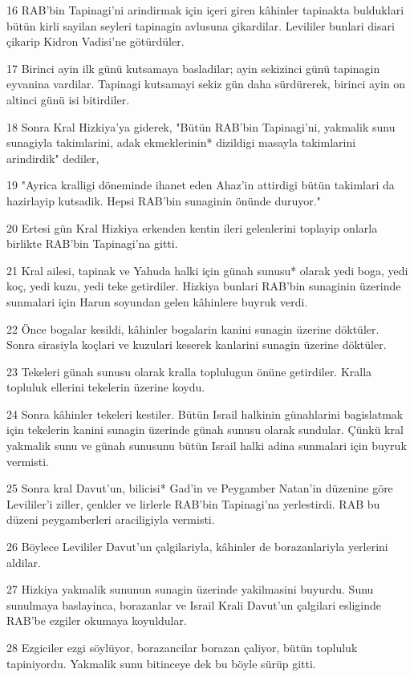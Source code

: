 \par 16 RAB'bin Tapinagi'ni arindirmak için içeri giren kâhinler tapinakta bulduklari bütün kirli sayilan seyleri tapinagin avlusuna çikardilar. Levililer bunlari disari çikarip Kidron Vadisi'ne götürdüler.
\par 17 Birinci ayin ilk günü kutsamaya basladilar; ayin sekizinci günü tapinagin eyvanina vardilar. Tapinagi kutsamayi sekiz gün daha sürdürerek, birinci ayin on altinci günü isi bitirdiler.
\par 18 Sonra Kral Hizkiya'ya giderek, "Bütün RAB'bin Tapinagi'ni, yakmalik sunu sunagiyla takimlarini, adak ekmeklerinin* dizildigi masayla takimlarini arindirdik" dediler,
\par 19 "Ayrica kralligi döneminde ihanet eden Ahaz'in attirdigi bütün takimlari da hazirlayip kutsadik. Hepsi RAB'bin sunaginin önünde duruyor."
\par 20 Ertesi gün Kral Hizkiya erkenden kentin ileri gelenlerini toplayip onlarla birlikte RAB'bin Tapinagi'na gitti.
\par 21 Kral ailesi, tapinak ve Yahuda halki için günah sunusu* olarak yedi boga, yedi koç, yedi kuzu, yedi teke getirdiler. Hizkiya bunlari RAB'bin sunaginin üzerinde sunmalari için Harun soyundan gelen kâhinlere buyruk verdi.
\par 22 Önce bogalar kesildi, kâhinler bogalarin kanini sunagin üzerine döktüler. Sonra sirasiyla koçlari ve kuzulari keserek kanlarini sunagin üzerine döktüler.
\par 23 Tekeleri günah sunusu olarak kralla toplulugun önüne getirdiler. Kralla topluluk ellerini tekelerin üzerine koydu.
\par 24 Sonra kâhinler tekeleri kestiler. Bütün Israil halkinin günahlarini bagislatmak için tekelerin kanini sunagin üzerinde günah sunusu olarak sundular. Çünkü kral yakmalik sunu ve günah sunusunu bütün Israil halki adina sunmalari için buyruk vermisti.
\par 25 Sonra kral Davut'un, bilicisi* Gad'in ve Peygamber Natan'in düzenine göre Levililer'i ziller, çenkler ve lirlerle RAB'bin Tapinagi'na yerlestirdi. RAB bu düzeni peygamberleri araciligiyla vermisti.
\par 26 Böylece Levililer Davut'un çalgilariyla, kâhinler de borazanlariyla yerlerini aldilar.
\par 27 Hizkiya yakmalik sununun sunagin üzerinde yakilmasini buyurdu. Sunu sunulmaya baslayinca, borazanlar ve Israil Krali Davut'un çalgilari esliginde RAB'be ezgiler okumaya koyuldular.
\par 28 Ezgiciler ezgi söylüyor, borazancilar borazan çaliyor, bütün topluluk tapiniyordu. Yakmalik sunu bitinceye dek bu böyle sürüp gitti.
